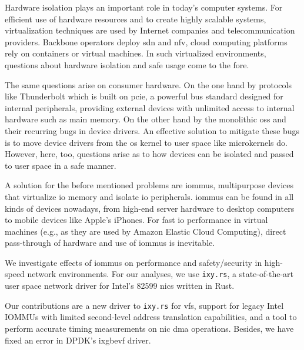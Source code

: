 \small

Hardware isolation plays an important role in today's computer systems. For
efficient use of hardware resources and to create highly scalable systems,
virtualization techniques are used by Internet companies and telecommunication
providers. Backbone operators deploy \ac{sdn} and \ac{nfv}, cloud computing
platforms rely on containers or virtual machines. In such virtualized
environments, questions about hardware isolation and safe usage come to the
fore.

The same questions arise on consumer hardware. On the one hand by protocols like
Thunderbolt which is built on \acs{pcie}, a powerful bus standard designed for
internal peripherals, providing external devices with unlimited access to
internal hardware such as main memory. On the other hand by the monolithic
\acp{os} and their recurring bugs in device drivers. An effective solution to
mitigate these bugs is to move device drivers from the \ac{os} kernel to user
space like microkernels do. However, here, too, questions arise as to how
devices can be isolated and passed to user space in a safe manner.

A solution for the before mentioned problems are \acp{iommu}, multipurpose
devices that virtualize \ac{io} memory and isolate \ac{io} peripherals.
\acp{iommu} can be found in all kinds of devices nowadays, from high-end server
hardware to desktop computers to mobile devices like Apple's iPhones. For fast
\ac{io} performance in virtual machines (e.g., as they are used by Amazon
Elastic Cloud Computing), direct pass-through of hardware and use of \acp{iommu}
is inevitable.

We investigate effects of \acp{iommu} on performance and safety/security in
high-speed network environments. For our analyses, we use \texttt{ixy.rs}, a
state-of-the-art user space network driver for Intel's 82599 \acp{nic} written
in Rust.

Our contributions are a new driver to \texttt{ixy.rs} for \acp{vf}, support for
legacy Intel IOMMUs with limited second-level address translation capabilities,
and a tool to perform accurate timing measurements on \ac{nic} \acs{dma}
operations. Besides, we have fixed an error in DPDK's ixgbevf driver.

